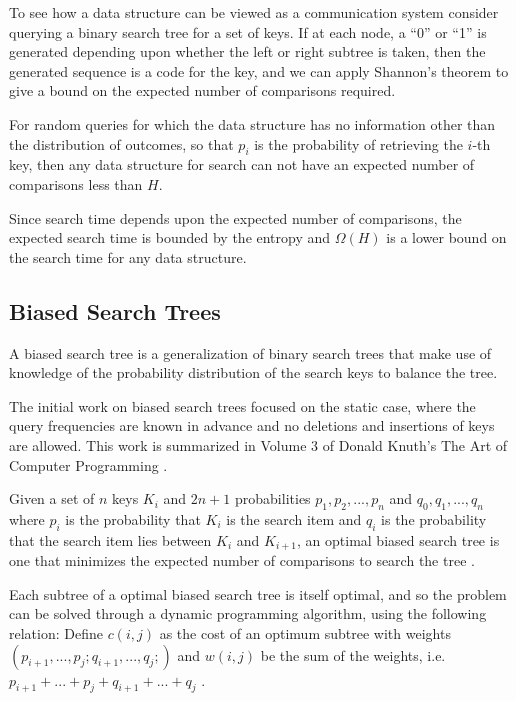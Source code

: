 \documentclass[mcs]{scsthesis}
\begin{document}
To see how a data structure can be viewed as a communication system consider 
querying a binary search tree for a set of keys. If at each node, a ``0'' or
``1'' is generated depending upon whether the left or right subtree is taken,
then the generated sequence is a code for the key, and we can apply Shannon's
theorem to give a bound on the expected number of comparisons required.

For random queries for which the data structure has no information other than
the distribution of outcomes, so that \(p_i\) is the probability of retrieving
the \(i\)-th key, then any data structure for search can not have an expected
number of comparisons less than \(H\).

Since search time depends upon the expected number of comparisons, the expected
search time is bounded by the entropy and \(\Omega(H)\) is a lower bound on
the search time for any data structure.

\subsection{Biased Search Trees}

A biased search tree is a generalization of binary search trees that make use
of knowledge of the probability distribution of the search keys to balance the
tree.

The initial work on biased search trees focused on the static case, where
the query frequencies are known in advance and no deletions and insertions of
keys are allowed. This work is summarized in Volume 3 of Donald Knuth's The Art
of Computer Programming \cite{knuth}.

Given a set of $n$ keys \(K_i\) and \(2n + 1\) probabilities
\(p_1, p_2, ..., p_n\) and \(q_0, q_1, ..., q_n\) where \(p_i\) is the
probability that \(K_i\) is the search item and \(q_i\) is the
probability that the search item lies between \(K_i\) and \(K_{i+1}\), an
optimal biased search tree is one that minimizes the expected number of
comparisons to search the tree \cite{knuth}. %

Each subtree of a optimal biased search tree is itself optimal, and so the
problem can be solved through a dynamic programming algorithm, using the
following relation: Define \( c(i,j)\) as the cost of an optimum subtree with
weights \((p_{i+1}, ..., p_j; q_{i+1}, ..., q_j;)\) and \(w(i, j)\) be the
sum of the weights, i.e. \(p_{i+1} + ... + p_j + q_{i + 1} + ... + q_j \)
\cite{knuth}.
\end{document}
